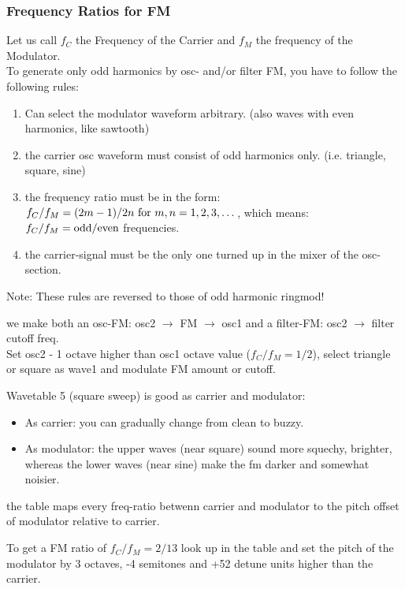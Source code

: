 \subsubsection{Frequency Ratios for FM}
Let us call $f_C$ the Frequency of the Carrier and $f_M$ the frequency of the Modulator.\\
To generate only odd harmonics by osc- and/or filter FM, you have to follow the following rules:
\begin{enumerate}
	\item  Can select the modulator waveform arbitrary. (also waves with even harmonics, like sawtooth)
	\item the carrier osc waveform must consist of odd harmonics only. (i.e. triangle, square, sine)
	\item the frequency ratio must be in the form:
	$f_C / f_M = (2m-1) / 2n \text{ for } m,n = 1, 2, 3, \dots$, which	means: $f_C / f_M = \text{odd} / \text{even}$ frequencies.
	\item the carrier-signal must be the only one turned up in the mixer of the osc-section.
\end{enumerate}
Note: These rules are reversed to those of odd harmonic ringmod!
\begin{example}[Microwave 2/XT(k) or Q]
	we make both an osc-FM: osc2 $\to$ FM $\to$ osc1 and a filter-FM: osc2 $\to$ filter cutoff freq.\\
	Set osc2 - 1 octave higher than osc1 octave value ($f_C / f_M = 1 / 2$), select triangle or square as wave1 and modulate FM amount or cutoff.
\end{example}
\begin{example}[for XT]
	Wavetable 5 (square sweep) is good as carrier and modulator:
	\begin{itemize}
		\item As carrier: you can gradually change from clean to buzzy.
		\item As modulator: the upper waves (near square) sound more squechy, brighter, whereas the lower waves (near sine) make the fm darker and somewhat noisier.
	\end{itemize}
\end{example}
the table maps every freq-ratio betwenn carrier and modulator to the pitch offset of modulator relative to carrier.
\begin{example}
	To get a FM ratio of $f_C / f_M = 2 / 13$ look up in the table and set the pitch of the modulator by 3 octaves, -4 semitones and +52 detune units higher than the carrier.
\end{example}
